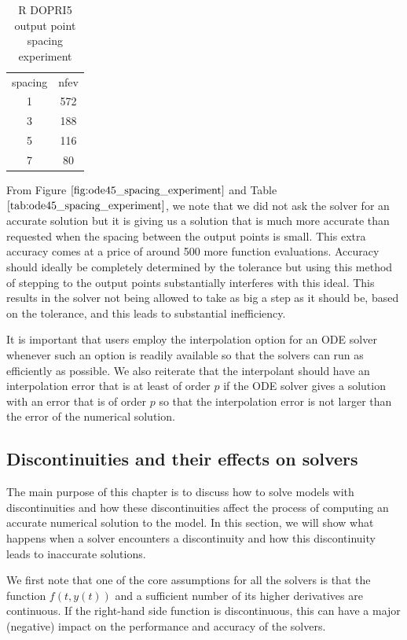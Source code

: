 \begin{table}[h]
\caption {R DOPRI5 output point spacing experiment} \label{tab:ode45_spacing_experiment} 
\begin{center}
\begin{tabular}{ c c }
spacing & nfev \\ 
1 & 572 \\
3 & 188 \\
5 & 116 \\
7 & 80 \\
\end{tabular}
\end{center}
\end{table}

From Figure $\ref{fig:ode45_spacing_experiment}$ and Table $\ref{tab:ode45_spacing_experiment}$, we note that we did not ask the solver for an accurate solution but it is giving us a solution that is much more accurate than requested when the spacing between the output points is small. This extra accuracy comes at a price of around 500 more function evaluations. Accuracy should ideally be completely determined by the tolerance but using this method of stepping to the output points substantially interferes with this ideal. This results in the solver not being allowed to take as big a step as it should be, based on the tolerance, and this leads to substantial inefficiency. 

It is important that users employ the interpolation option for an ODE solver whenever such an option is readily available so that the solvers can run as efficiently as possible. We also reiterate that the interpolant should have an interpolation error that is at least of order $p$ if the ODE solver gives a solution with an error that is of order $p$ so that the interpolation error is not larger than the error of the numerical solution.

\subsection{Discontinuities and their effects on solvers}
\label{subsection:effect_of_discontinuity}
The main purpose of this chapter is to discuss how to solve models with discontinuities and how these discontinuities affect the process of computing an accurate numerical solution to the model. In this section, we will show what happens when a solver encounters a discontinuity and how this discontinuity leads to inaccurate solutions.

We first note that one of the core assumptions for all the solvers is that the function $f(t, y(t))$ and a sufficient number of its higher derivatives are continuous. If the right-hand side function is discontinuous, this can have a major (negative) impact on the performance and accuracy of the solvers. 

